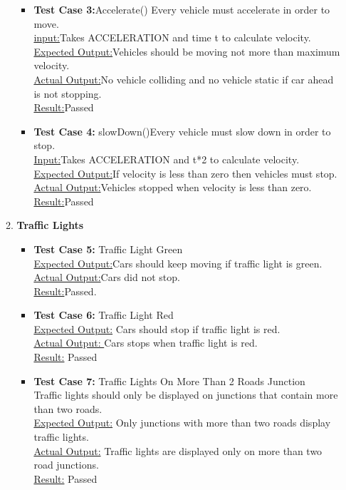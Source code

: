 \documentclass[11pt]{article}
\begin{document}
\begin{itemize}
\begin{enumerate}
\begin{itemize}
	\item \textbf{Test Case 3:}Accelerate() Every vehicle must accelerate in order to move.\hfill \\
		\underline{input:}Takes ACCELERATION and time t to calculate velocity.\hfill \\
		\underline{Expected Output:}Vehicles should be moving not more than maximum velocity.\hfill \\
		\underline{Actual Output:}No vehicle colliding and no vehicle static if car ahead is not stopping.\hfill \\
		\underline{Result:}Passed\hfill \\

	\item \textbf{Test Case 4:} slowDown()Every vehicle must slow down in order to stop.\hfill \\
		\underline{Input:}Takes ACCELERATION and t*2 to calculate velocity.\hfill \\
		\underline{Expected Output:}If velocity is less than zero then vehicles must stop.\hfill \\
		\underline{Actual Output:}Vehicles stopped when velocity is less than zero.\hfill \\
		\underline{Result:}Passed\hfill \\
	\end{itemize}

\item \textbf{Traffic Lights}
	\begin{itemize}
		\item \textbf{Test Case 5:} Traffic Light Green \hfill \\
		\underline {Expected Output:}Cars should keep moving if traffic light is green.\hfill \\
		\underline{ Actual Output:}Cars did not stop.\hfil \\
		\underline{ Result:}Passed.

		\item \textbf{Test Case 6:} Traffic Light Red\hfill \\
		 \underline{Expected Output:} Cars should stop if traffic light is red.\hfill \\
		\underline{ Actual Output: }Cars stops when traffic light is red.\hfill \\
		 \underline{Result:} Passed
 
		 \item \textbf{Test Case 7:} Traffic Lights On More Than 2 Roads Junction\hfill \\
 		Traffic lights should only be displayed on junctions that contain more than two roads.\hfill \\
 		\underline{Expected Output:} Only junctions with more than two roads display traffic lights.\hfill \\
		\underline{Actual Output:} Traffic lights are displayed only on more than two road junctions.\hfill \\
		\underline{Result:} Passed\hfill \\


\end{itemize}
\end{enumerate}
\end{itemize}
\end{document}
